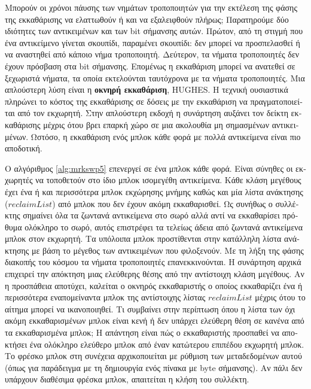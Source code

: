 \begin{greek}
Μπορούν οι χρόνοι πάυσης των νημάτων τροποποιητών για την εκτέλεση 
της φάσης της εκκαθάρισης να ελαττωθούν ή και να εξαλειφθούν 
πλήρως; Παρατηρούμε δύο ιδιότητες των αντικειμένων και των bit
σήμανσης αυτών. Πρώτον, από τη στιγμή που ένα αντικείμενο γίνεται
σκουπίδι, παραμένει σκουπίδι: δεν μπορεί να προσπελασθεί ή να
αναστηθεί από κάποιο νήμα τροποποιητή. Δεύτερον, τα νήματα
τροποποιητές δεν έχουν πρόσβαση στα bit σήμανσης. Επομένως η
εκκαθάριση μπορεί να ανατεθεί σε ξεχωριστά νήματα, τα οποία 
εκτελούνται ταυτόχρονα με τα νήματα τροποποιητές. Μια απλούστερη
λύση είναι η \textbf{οκνηρή εκκαθάριση}, HUGHES.
Η τεχνική ουσιαστικά πληρώνει το κόστος της εκκαθάρισης σε δόσεις 
με την εκκαθάριση να πραγματοποιείται από τον εκχωρητή. Στην 
απλούστερη εκδοχή η συνάρτηση  αυξάνει τον
δείκτη εκκαθάρισης μέχρις ότου βρει επαρκή χώρο σε μια ακολουθία
μη σημασμένων αντικειμένων. Ωστόσο, η εκκαθάριση ενός μπλοκ κάθε 
φορά με πολλά αντικείμενα είναι πιο αποδοτική. 

Ο αλγόριθμος \ref{alg:mrkswp5} επενεργεί σε ένα μπλοκ κάθε 
φορά. Είναι σύνηθες οι εκχωρητές να τοποθετούν στο ίδιο μπλοκ
ισομεγέθη αντικείμενα. Κάθε κλάση μεγέθους έχει ένα ή και 
περισσότερα μπλοκ εκχώρησης μνήμης καθώς και μία λίστα ανάκτησης
($reclaimList$) από μπλοκ που δεν έχουν ακόμη εκκαθαρισθεί.
Ως συνήθως ο συλλέκτης σημαίνει όλα τα ζωντανά αντικείμενα στο 
σωρό αλλά αντί να εκκαθαρίσει πρόθυμα ολόκληρο το σωρό, αυτός
επιστρέφει τα τελείως άδεια από ζωντανά αντικείμενα μπλοκ στον
εκχωρητή. Τα υπόλοιπα μπλοκ προστίθενται στην κατάλληλη λίστα
ανάκτησης με βάση το μέγεθος των αντικειμένων που φιλοξενούν.
Με τη λήξη της φάσης διακοπής του κόσμου τα νήματα τροποποιητές
επανεκκινούνται. Η συνάρτηση  αρχικά επιχειρεί
την απόκτηση μιας ελεύθερης θέσης από την αντίστοιχη κλάση 
μεγέθους. Αν η προσπάθεια αποτύχει, καλείται ο οκνηρός εκκαθαριστής
ο οποίος εκκαθαρίζει ένα ή περισσότερα εναπομείναντα μπλοκ της
αντίστοιχης λίστας $reclaimList$ μέχρις ότου το αίτημα μπορεί
να ικανοποιηθεί. Τι συμβαίνει στην περίπτωση όπου η λίστα των
όχι ακόμη εκκαθαρισμένων μπλοκ είναι κενή ή δεν υπάρχει ελεύθερη
θέση σε κανένα από τα εκκαθαρισμένα μπλοκ; Η απάντηση είναι πώς
ο εκκαθαριστής προσπαθεί να αποκτήσει ένα ολόκληρο ελεύθερο μπλοκ
από έναν κατώτερου επιπέδου εκχωρητή μπλοκ. Το φρέσκο μπλοκ
στη συνέχεια αρχικοποιείται με ρύθμιση των μεταδεδομένων αυτού
(όπως για παράδειγμα με τη δημιουργία ενός πίνακα με byte σήμανσης).
Αν πάλι δεν υπάρχουν διαθέσιμα φρέσκα μπλοκ, απαιτείται η κλήση
του συλλέκτη.


\end{greek}

